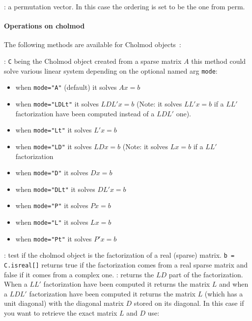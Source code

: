 \begin{varlist}
  : a permutation vector. In this case the ordering is set to be the one from perm.

\end{varlist}

\paragraph{Operations on cholmod}
The following methods are available for Cholmod objects~:
\begin{varlist}
  : \verb+C+ being the Cholmod object created from a sparse matrix $A$
  this method could solve various linear system depending on the optional named arg \verb+mode+:
     \begin{itemize} 
        \item when \verb+mode="A"+ (default) it solves $Ax=b$ 
        \item when \verb+mode="LDLt"+ it solves $LDL' x = b$ (Note: it solves $LL' x = b$ if a $LL'$ factorization 
        have been computed instead of a  $LDL'$ one).
        \item when \verb+mode="Lt"+ it solves $L' x = b$  
        \item when \verb+mode="LD"+ it solves $LD x = b$   (Note: it solves $L x = b$ if a $LL'$ factorization 
        \item when \verb+mode="D"+ it solves $D x = b$
        \item when \verb+mode="DLt"+ it solves $DL' x = b$
        \item when \verb+mode="P"+ it solves $P x = b$
        \item when \verb+mode="L"+ it solves $L x = b$
        \item when \verb+mode="Pt"+ it solves $P' x = b$
     \end{itemize}
  : test if the cholmod object is the factorization of a real (sparse) matrix.
                  \verb+b = C.isreal[]+ returns true if the factorization comes from a real
                  sparse matrix and false if it comes from a complex one.
  : returns the $LD$ part of the factorization. When a $LL'$
        factorization have been computed  it returns the matrix $L$ and when a $LDL'$
        factorization have been computed it returns the matrix $L$ (which has a unit diagonal) with
        the diagonal matrix $D$ stored on its diagonal. In this case if you want to retrieve
        the exact matrix $L$ and $D$ use:
        \begin{Verbatim}

\end{Verbatim}
\end{varlist}
